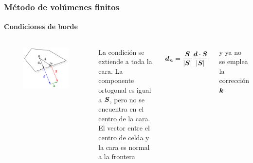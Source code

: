 \begin{frame}
    \frametitle{M\'etodo de vol\'umenes finitos}
    \framesubtitle{Condiciones de borde}

    \begin{columns}

      \begin{figure}[h]
        \begin{center}
          \includegraphics[width = \textwidth]{Imagenes/BC}
        \end{center}
      \end{figure}


      La condici\'on se extiende a toda la cara. La componente ortogonal es igual a $\boldsymbol{S}$, pero no se encuentra en el centro de la cara. El vector entre el centro de celda y la cara es normal a la frontera

      $$ \boldsymbol{d_n} = \frac{\boldsymbol{S}}{|\boldsymbol{S}|} \frac{\boldsymbol{d} \cdot \boldsymbol{S}}{|\boldsymbol{S}|} $$

      y ya no se emplea la correcci\'on $\boldsymbol{k}$

    \end{columns}

\end{frame}



